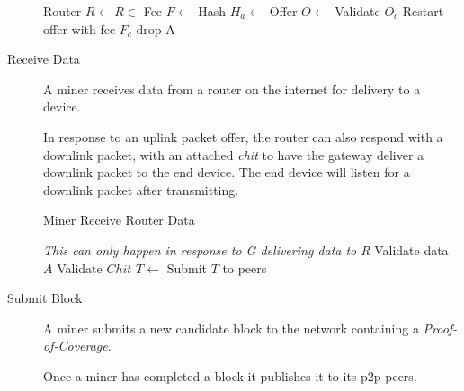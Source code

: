 \documentclass[letterpaper,11pt]{article}
\begin{document}
\begin{description}
\begin{algorithm}[!htb]
       {
        Router $R \leftarrow R \in $  \;
        Fee $F \leftarrow $  \;
        Hash $H_a \leftarrow $  \;
        Offer $O \leftarrow $  \;
         {
           {
            Validate $O_c$
             {
               {
                Restart offer with fee $F_c$\;
              }
               {
                drop A \;
              }
            }
          }
        }
      }
    \end{algorithm}
    \FloatBarrier


  \item [Receive Data] A miner receives data from a router on the internet for delivery to a device.

    In response to an uplink packet offer, the router can also respond with a downlink packet, with an attached \emph{chit} to have the gateway deliver a downlink packet to the end device. The end device will listen for a downlink packet after transmitting.

    \begin{algorithm}[!htb]
      \DontPrintSemicolon
      \caption{Miner Receive Router Data}\label{proto:miner.data.receive}

       {
        \emph{This can only happen in response to G delivering data to R}
        Validate data $A$ \;
        Validate $Chit$\;
         \;
        $T \leftarrow $  \;
        Submit $T$ to peers\;
      }
    \end{algorithm}
    \FloatBarrier


  \item [Submit Block] A miner submits a new candidate block to the network containing a \emph{Proof-of-Coverage}.

    Once a miner has completed a block it publishes it to its p2p peers.


\end{description}
\end{document}
